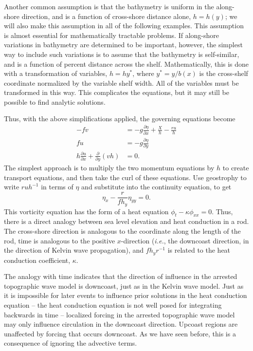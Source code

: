 \documentclass[11pt]{report}
\numberwithin{equation}{section}
\begin{document}
Another common assumption is that the bathymetry is uniform in the along-shore direction, and is a function of cross-shore distance alone, $h=h(y)$; we will also make this assumption in all of the following examples.  This assumption is almost essential for mathematically tractable problems.  If along-shore variations in bathymetry are determined to be important, however, the simplest way to include such variations is to assume that the bathymetry is self-similar, and is a function of percent distance across the shelf.  Mathematically, this is done with a transformation of variables, $h=h{y^*}$, where $y^*=y/b(x)$ is the cross-shelf coordinate normalized by the variable shelf width.  All of the variables must be transformed in this way.  This complicates the equations, but it may still be possible to find analytic solutions.

Thus, with the above simplifications applied, the governing equations become
\begin{align}
    - f v &= -g\frac{\partial \eta}{\partial x} + \frac{X}{h} - \frac{r u}{h}   \label{eq:u-atw} \\
     f u &= -g\frac{\partial \eta}{\partial y} \label{eq:v-atw} \\
    h \frac{\partial u}{\partial x} + \frac{\partial}{\partial y} (v h) &= 0. \label{eq:cont-atw}
\end{align}
The simplest approach is to multiply the two momentum equations by $h$ to create transport equations, and then take the curl of these equations.  Use geostrophy to write $r u h^{-1}$ in terms of $\eta$ and substitute into the continuity equation, to get
\begin{equation}
    \label{eq:atw}
    \eta_x - \frac{r}{f h_y} \eta_{yy} = 0.
\end{equation}
This vorticity equation has the form of a heat equation $\phi_t - \kappa \phi_{xx} = 0$.  Thus, there is a direct analogy between sea level elevation and heat conduction in a rod.  The cross-shore direction is analogous to the coordinate along the length of the rod, time is analogous to the positive $x$-direction (\emph{i.e.}, the downcoast direction, in the direction of Kelvin wave propagation), and $f h_y r^{-1}$ is related to the heat conduction coefficient, $\kappa$.  

The analogy with time indicates that the direction of influence in the arrested topographic wave model is downcoast, just as in the Kelvin wave model.  Just as it is impossible for later events to influence prior solutions in the heat conduction equation -- the heat conduction equation is not well posed for integrating backwards in time -- localized forcing in the arrested topographic wave model may only influence circulation in the downcoast direction.  Upcoast regions are unaffected by forcing that occurs downcoast.  As we have seen before, this is a consequence of ignoring the advective terms.
\end{document}
